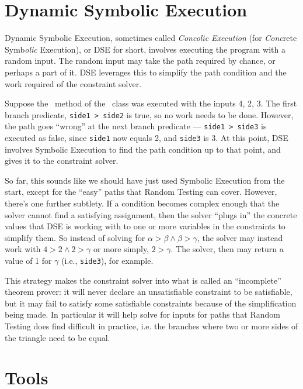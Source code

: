 \section{Dynamic Symbolic Execution}

Dynamic Symbolic Execution, sometimes called {\it Concolic Execution} (for {\it
Conc}rete Symb{\it olic} Execution), or DSE for short, involves executing the
program with a random input. The random input may take the path required by
chance, or perhaps a part of it. DSE leverages this to simplify the
path condition and the work required of the constraint solver. 

Suppose the \classifymethod~method of the \triangleclass~class was executed with
the inputs 4, 2, 3. The first branch predicate, {\tt side1 > side2} is true, so
no work needs to be done. However, the path goes ``wrong'' at the next branch
predicate --- {\tt side1 > side3} is executed as false, since {\tt side1} now
equals 2, and {\tt side3} is 3. At this point, DSE involves Symbolic Execution
to find the path condition up to that point, and gives it to the constraint
solver. 

So far, this sounds like we should have just used Symbolic Execution from the
start, except for the ``easy'' paths that Random Testing can cover. However,
there’s one further subtlety. If a condition becomes complex enough that the
solver cannot find a satisfying assignment, then the solver ``plugs in'' the
concrete values that DSE is working with to one or more variables in the
constraints to simplify them. So instead of solving for $\alpha > \beta \wedge
\beta > \gamma$, the solver may instead work with $4 > 2 \wedge 2 > \gamma$ or
more simply, $2 > \gamma$. The solver, then may return a value of 1 for $\gamma$
(i.e., {\tt side3}), for example.

This strategy makes the constraint solver into what is called an ``incomplete''
theorem prover: it will never declare an unsatisfiable constraint to be
satisfiable, but it may fail to satisfy some satisfiable constraints because of
the simplification being made. In particular it will help solve for inputs for
paths that Random Testing does find difficult in practice, i.e. the branches
where two or more sides of the triangle need to be equal.

\section{Tools}



